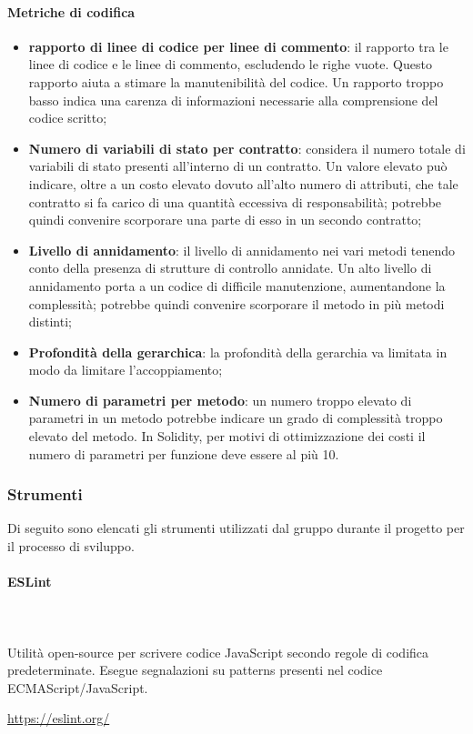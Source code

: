 		\paragraph{Metriche di codifica}
			\begin{itemize}
				\item \textbf{rapporto di linee di codice per linee di commento}: il rapporto tra le linee di codice e le linee di commento, escludendo le righe vuote. Questo rapporto aiuta a stimare la manutenibilità del codice. Un rapporto troppo basso indica una carenza di informazioni	necessarie alla comprensione del codice scritto;
				\item \textbf{Numero di variabili di stato per contratto}: considera il numero totale di variabili di stato presenti all'interno di un contratto. Un valore elevato può indicare, oltre a un costo elevato dovuto all'alto numero di attributi, che tale contratto si fa carico di una quantità eccessiva di responsabilità; potrebbe quindi convenire scorporare una parte di esso in un secondo contratto;
				\item \textbf{Livello di annidamento}: il livello di annidamento nei vari metodi tenendo	conto della presenza di strutture di controllo annidate.  Un alto livello di annidamento porta a un codice di difficile manutenzione, aumentandone la complessità; potrebbe quindi convenire scorporare il metodo in più metodi distinti;
				\item \textbf{Profondità della gerarchica}: la profondità della gerarchia va limitata in modo da limitare l'accoppiamento;
				\item \textbf{Numero di parametri per metodo}: un numero troppo elevato di parametri in un metodo potrebbe indicare un grado di complessità troppo elevato del metodo. In Solidity\glo, per motivi di ottimizzazione dei costi il numero di parametri per funzione deve essere al più 10.
			\end{itemize}
			
	\subsubsection{Strumenti}
	Di seguito sono elencati gli strumenti utilizzati dal gruppo durante il 
	progetto per il processo di sviluppo.
			
		\paragraph{ESLint} \mbox{}\\ \mbox{}\\
		Utilità open-source per scrivere codice JavaScript secondo regole di codifica 
		predeterminate. Esegue segnalazioni su patterns presenti nel codice 
		ECMAScript/JavaScript.\\
		\centerline{\url{https://eslint.org/}}
				
